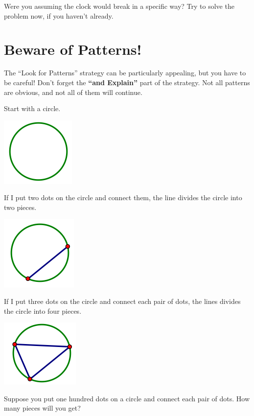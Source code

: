 Were you assuming the clock would break in a specific way?  Try to solve the problem now, if you haven't already.  


\section{Beware of Patterns!}\label{sec:BewarePatterns}

The ``Look for Patterns'' strategy can be particularly appealing, but you have to be careful!  Don't forget the {\bf ``and Explain''} part of the strategy.  Not all patterns are obvious, and not all of them will continue.

\begin{problem}
Start with a circle.  
\begin{center}
\includegraphics[height=3 cm]{../Pictures/ProbSolvingPics/circle}
\end{center}
If I put two dots on the circle and connect them, the line divides the circle into two pieces.
\begin{center}
\includegraphics[height=3 cm]{../Pictures/ProbSolvingPics/twodots}
\end{center}
If I put three dots on the circle and connect each pair of dots, the lines divides the circle into four pieces.
\begin{center}
\includegraphics[height=3 cm]{../Pictures/ProbSolvingPics/threedots}
\end{center}
Suppose you put one hundred dots on a circle and connect each pair of dots.  How many pieces will you get? 
\end{problem}

